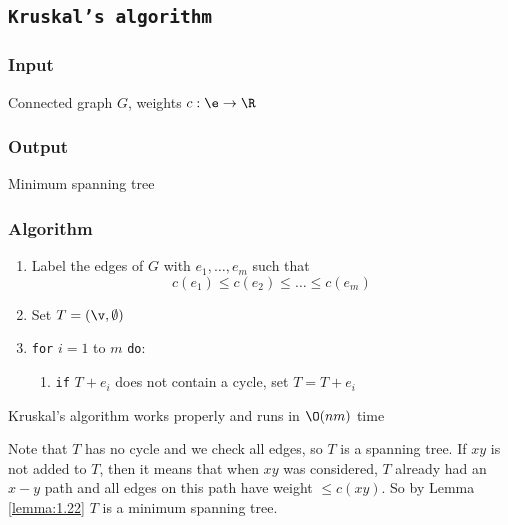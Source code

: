 \subsection{\texttt{Kruskal's algorithm}}
\subsubsection{Input}

Connected graph $G$, weights $c: \e \rightarrow \R$

\subsubsection{Output}

Minimum spanning tree

\subsubsection{Algorithm}
\begin{enumerate}
    \item Label the edges of $G$ with $e_1, \dots, e_m$ such that
    \begin{equation*}
        c(e_1) \leq c(e_2) \leq \dots \leq c(e_m)
    \end{equation*}
    \item Set $T = (\v, \emptyset)$
    \item \texttt{for} $i = 1$ to $m$ \texttt{do}:
    \begin{enumerate}
        \item \texttt{if} $T + e_i$ does not contain a cycle, set $T = T + e_i$
    \end{enumerate}
\end{enumerate}
\begin{customtheorem}{1.23}
    \label{theorem:1.23}
    Kruskal's algorithm works properly and runs in $\O(nm)$ time
\end{customtheorem}
\begin{prf}
    Note that $T$ has no cycle and we check all edges, so $T$ is a spanning tree. If $xy$ is not added to $T$, then it means that when $xy$ was considered, $T$ already had an $x - y$ path and all edges on this path have weight $\leq c(xy)$. So by Lemma \ref{lemma:1.22} $T$ is a minimum spanning tree.
\end{prf}